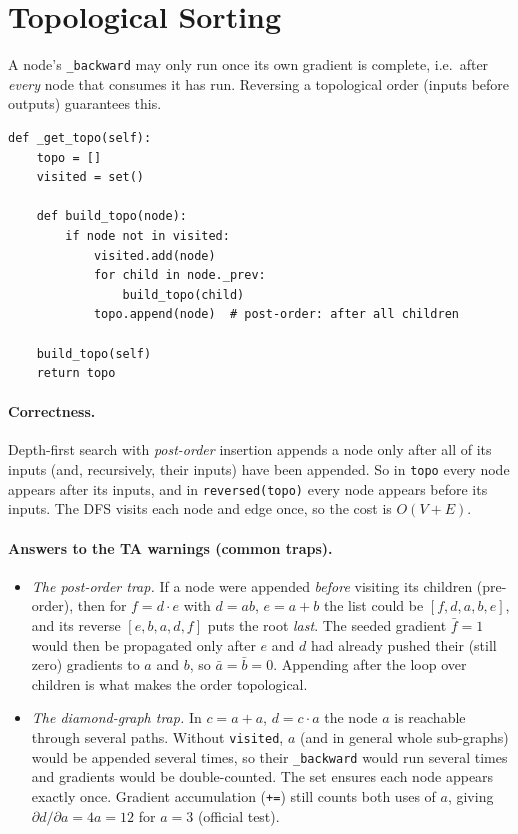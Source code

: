 \documentclass[11pt,a4paper]{article}
\begin{document}
\section{Topological Sorting}
A node's \texttt{\_backward} may only run once its own gradient is complete, i.e.\ after \emph{every}
node that consumes it has run. Reversing a topological order (inputs before outputs) guarantees this.
\begin{lstlisting}
def _get_topo(self):
    topo = []
    visited = set()

    def build_topo(node):
        if node not in visited:
            visited.add(node)
            for child in node._prev:
                build_topo(child)
            topo.append(node)  # post-order: after all children

    build_topo(self)
    return topo
\end{lstlisting}
\paragraph{Correctness.} Depth-first search with \emph{post-order} insertion appends a node only after
all of its inputs (and, recursively, their inputs) have been appended. So in \texttt{topo} every node
appears after its inputs, and in \texttt{reversed(topo)} every node appears before its inputs.
The DFS visits each node and edge once, so the cost is $O(V+E)$.

\paragraph{Answers to the TA warnings (common traps).}
\begin{itemize}
  \item \emph{The post-order trap.} If a node were appended \emph{before} visiting its children (pre-order),
        then for $f=d\cdot e$ with $d=ab$, $e=a+b$ the list could be $[f, d, a, b, e]$, and its reverse
        $[e, b, a, d, f]$ puts the root \emph{last}. The seeded gradient $\bar f = 1$ would then be propagated only
        after $e$ and $d$ had already pushed their (still zero) gradients to $a$ and $b$, so $\bar a = \bar b = 0$.
        Appending after the loop over children is what makes the order topological.
  \item \emph{The diamond-graph trap.} In $c=a+a$, $d=c\cdot a$ the node $a$ is reachable through several paths.
        Without \texttt{visited}, $a$ (and in general whole sub-graphs) would be appended several times, so
        their \texttt{\_backward} would run several times and gradients would be double-counted.
        The set ensures each node appears exactly once. Gradient accumulation (\texttt{+=}) still counts
        both uses of $a$, giving $\partial d/\partial a = 4a = 12$ for $a=3$ (official test).
\end{itemize}
\end{document}
